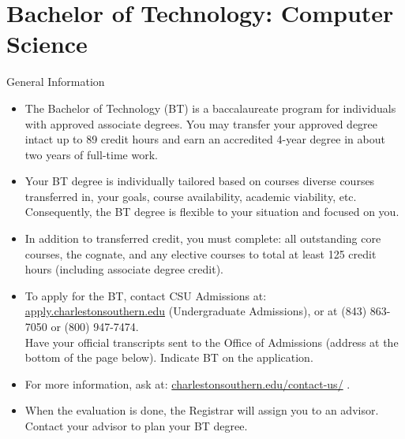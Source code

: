 %
\section*{Bachelor of Technology: Computer Science}
\begin{reqgroup}{General Information}
\begin{itemize}\small

	\item The Bachelor of Technology (BT) is a baccalaureate program for individuals with approved associate degrees. You may transfer your approved degree intact up to 89 credit hours and earn an accredited 4-year degree in about two years of full-time work.

	\item Your BT degree is individually tailored based on courses diverse courses transferred in, your goals, course availability, academic viability, etc. Consequently, the BT degree is flexible to your situation and focused on you.

	\item In addition to transferred credit, you must complete: all outstanding core courses, the cognate, and any elective courses to total at least 125 credit hours (including associate degree credit).

	\item To apply for the BT, contact CSU Admissions at:
		\href{https://apply.charlestonsouthern.edu/}{apply.charlestonsouthern.edu} (Undergraduate Admissions), or at (843) 863-7050 or (800) 947-7474.\\
		Have your official transcripts sent to the Office of Admissions (address at the bottom of the page below). Indicate BT on the application.

	\item For more information, ask at: \href{https://www.charlestonsouthern.edu/contact-us/}{charlestonsouthern.edu/contact-us/} .


	\item When the evaluation is done, the Registrar will assign you to an advisor. Contact your advisor to plan your BT degree.
\end{itemize}
\end{reqgroup}

